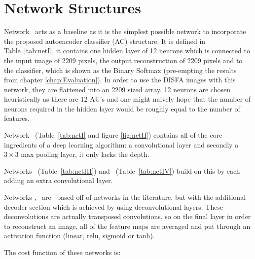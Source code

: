   \section{Network Structures}


    Network \networkI\ acts as a baseline as it is the simplest possible
    network to incorporate the proposed autoencoder classifier (AC)
    structure. It is defined in Table~\ref{tab:netI}, it contains one hidden
    layer of 12 neurons which is connected to the input image of 2209 pixels,
    the output reconstruction of 2209 pixels and to the classifier, which is
    shown as the Binary Softmax (pre-empting the results from chapter
    \ref{chap:Evaluation}). In order to use the DISFA images with this network,
    they are flattened into an 2209 sized array. 12 neurons are chosen
    heuristically as there are 12 AU's and one might naively hope that the
    number of neurons required in the hidden layer would be roughly equal to the
    number of features.

    Network \networkII\ (Table~\ref{tab:netI} and figure \ref{fig:netII})
    contains all of the core ingredients of a deep learning algorithm: a
    convolutional layer and secondly a $3\times 3$ max pooling layer, it only lacks the depth.

    Networks \networkIII\ (Table~\ref{tab:netIII}) and \networkIV\
    (Table~\ref{tab:netIV}) build on this by each adding an extra convolutional
    layer.

    Networks \networkII, \networkIII\ are \networkIV\ based off of networks in
    the literature, but with the additional decoder section which is achieved by
    using deconvolutional layers. These deconvolutions are actually transposed
    convolutions, so on the final layer in order to reconstruct an image, all of
    the feature maps are averaged and put through an activation function (linear, relu, sigmoid or tanh).

    The cost function of these networks is:

